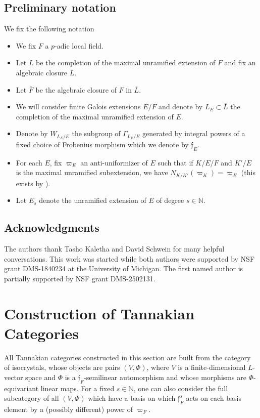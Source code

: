 \documentclass[11pt]{amsart}
\theoremstyle{definition}
\newcommand{\ov}{\overline}
\newcommand{\mf}{\mathfrak}
\newcommand{\N}{\mathbb{N}}
\begin{document}
\subsection{Preliminary notation}
We fix the following notation
\begin{itemize}
    \item We fix $F$ a $p$-adic local field.
    \item Let $L$ be the completion of the maximal unramified extension of $F$ and fix an algebraic closure $\ov{L}$. 
    \item Let $\ov{F}$ be the algebraic closure of $F$ in $\ov{L}$.
    \item We will consider finite Galois extensions $E/F$ and denote by $L_E \subset \ov{L}$ the completion of the maximal unramified extension of $E$.
    \item Denote by $W_{L_E/E}$ the subgroup of $\Gamma_{L_E/E}$ generated by integral powers of a fixed choice of Frobenius morphism which we denote by $\mf{f}_E$.
    \item For each $E$, fix $\varpi_E$ an anti-uniformizer of $E$ such that if $K/E/F$ and $K'/E$ is the maximal unramified subextension, we have $N_{K/K'}(\varpi_{K}) = \varpi_{E}$ (this exists by \cite[Lemme 5.5]{Fargues}).
    \item Let $E_{s}$ denote the unramified extension of $E$ of degree $s \in \mathbb{N}$.
\end{itemize}

\subsection{Acknowledgments}
The authors thank Tasho Kaletha and David Schwein for many helpful conversations. This work was started while both authors were supported by NSF grant DMS-1840234 at the University of Michigan. The first named author is partially supported by NSF grant DMS-2502131.

\tableofcontents

\section{Construction of Tannakian Categories}
All Tannakian categories constructed in this section are built from the category of isocrystals, whose objects are pairs $(V,\Phi)$, where $V$ is a finite-dimensional $L$-vector space and $\Phi$ is a $\mf{f}_{F}$-semilinear automorphism and whose morphisms are $\Phi$-equivariant linear maps. For a fixed $s \in \N$, one can also consider the full subcategory of all $(V,\Phi)$ which have a basis on which $\mf{f}_{F}^{s}$ acts on each basis element by a (possibly different) power of $\varpi_{F}$.
\end{document}
